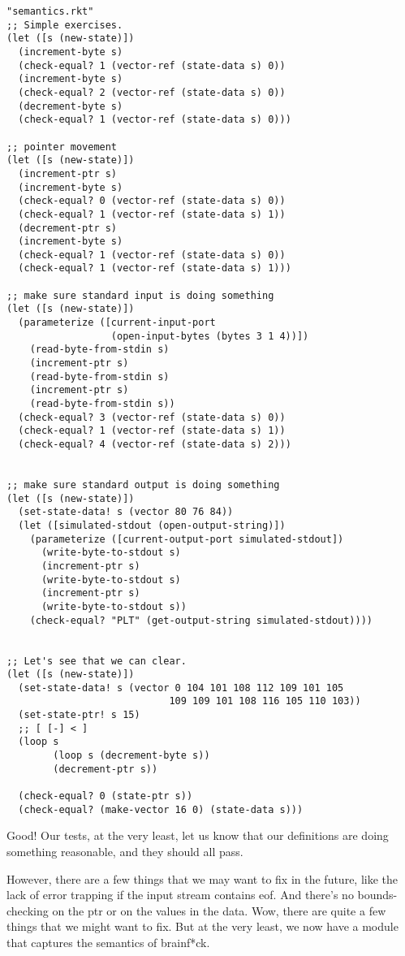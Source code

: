 \documentclass{article}
\begin{document}
\begin{verbatim}
"semantics.rkt"
;; Simple exercises.
(let ([s (new-state)])
  (increment-byte s)
  (check-equal? 1 (vector-ref (state-data s) 0))
  (increment-byte s)
  (check-equal? 2 (vector-ref (state-data s) 0))
  (decrement-byte s)
  (check-equal? 1 (vector-ref (state-data s) 0)))
 
;; pointer movement
(let ([s (new-state)])
  (increment-ptr s)
  (increment-byte s)
  (check-equal? 0 (vector-ref (state-data s) 0))
  (check-equal? 1 (vector-ref (state-data s) 1))
  (decrement-ptr s)
  (increment-byte s)
  (check-equal? 1 (vector-ref (state-data s) 0))
  (check-equal? 1 (vector-ref (state-data s) 1)))
 
;; make sure standard input is doing something
(let ([s (new-state)])
  (parameterize ([current-input-port
                  (open-input-bytes (bytes 3 1 4))])
    (read-byte-from-stdin s)
    (increment-ptr s)
    (read-byte-from-stdin s)
    (increment-ptr s)
    (read-byte-from-stdin s))
  (check-equal? 3 (vector-ref (state-data s) 0))
  (check-equal? 1 (vector-ref (state-data s) 1))
  (check-equal? 4 (vector-ref (state-data s) 2)))
 
 
;; make sure standard output is doing something
(let ([s (new-state)])
  (set-state-data! s (vector 80 76 84))
  (let ([simulated-stdout (open-output-string)])
    (parameterize ([current-output-port simulated-stdout])
      (write-byte-to-stdout s)
      (increment-ptr s)
      (write-byte-to-stdout s)
      (increment-ptr s)
      (write-byte-to-stdout s))
    (check-equal? "PLT" (get-output-string simulated-stdout))))
 
 
;; Let's see that we can clear.
(let ([s (new-state)])
  (set-state-data! s (vector 0 104 101 108 112 109 101 105
                            109 109 101 108 116 105 110 103))
  (set-state-ptr! s 15)
  ;; [ [-] < ]
  (loop s
        (loop s (decrement-byte s))
        (decrement-ptr s))
 
  (check-equal? 0 (state-ptr s))
  (check-equal? (make-vector 16 0) (state-data s)))
\end{verbatim}
Good! Our tests, at the very least, let us know that our definitions are doing something reasonable, and they should all pass.

However, there are a few things that we may want to fix in the future, like the lack of error trapping if the input stream contains eof. And there’s no bounds-checking on the ptr or on the values in the data. Wow, there are quite a few things that we might want to fix. But at the very least, we now have a module that captures the semantics of brainf*ck.
\end{document}
